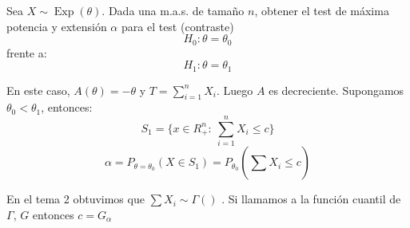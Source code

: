 \documentclass[openany]{book}
\begin{document}
\begin{example}
    Sea $ X \sim \operatorname{Exp}(\theta) $. Dada una m.a.s. de tamaño $ n $, obtener el test de máxima potencia y extensión $ \alpha $ para el test (contraste)
        $$ H_0: \theta = \theta_0 $$
    frente a:
    $$ H_1: \theta = \theta_1 $$
    
    En este caso, $ A(\theta) = -\theta $ y $ T = \sum\limits_{i=1}^{n}X_i $. Luego $ A $ es decreciente. Supongamos $ \theta_0<\theta_1 $, entonces:
    $$ S_1 = \{x \in R_{+}^{n}:\ \sum\limits_{i=1}^{n} X_i\leq  c\} $$
    $$ \alpha = P_{\theta=\theta_0}(X \in S_1) = P_{\theta_0}\left(\sum\limits_{}^{}X_i \leq  c\right)  $$

    En el tema 2 obtuvimos que $ \sum X_i \sim \Gamma() $ . Si llamamos a la función cuantil de $ \Gamma $, $ G $ entonces $ c = G_{\alpha} $
    
\end{example}
\end{document}
